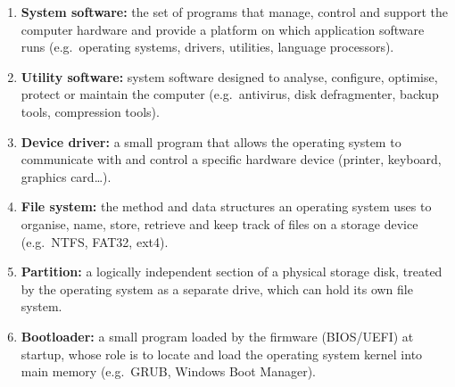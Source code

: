 \documentclass[11pt]{article}
\begin{document}
\begin{corrige}
\begin{enumerate}
\item \textbf{System software:} the set of programs that manage, control and support the computer hardware and provide a platform on which application software runs (e.g.\ operating systems, drivers, utilities, language processors).
\item \textbf{Utility software:} system software designed to analyse, configure, optimise, protect or maintain the computer (e.g.\ antivirus, disk defragmenter, backup tools, compression tools).
\item \textbf{Device driver:} a small program that allows the operating system to communicate with and control a specific hardware device (printer, keyboard, graphics card\ldots).
\item \textbf{File system:} the method and data structures an operating system uses to organise, name, store, retrieve and keep track of files on a storage device (e.g.\ NTFS, FAT32, ext4).
\item \textbf{Partition:} a logically independent section of a physical storage disk, treated by the operating system as a separate drive, which can hold its own file system.
\item \textbf{Bootloader:} a small program loaded by the firmware (BIOS/UEFI) at startup, whose role is to locate and load the operating system kernel into main memory (e.g.\ GRUB, Windows Boot Manager).
\end{enumerate}
\end{corrige}
\end{document}
